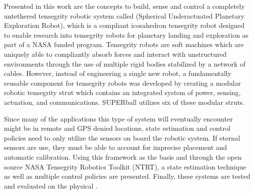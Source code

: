 Presented in this work are the concepts to build, sense and control a completely untethered tensegrity robotic system called \SB{} (Spherical Underactuated Planetary Exploration Robot), which is a compliant icosahedron tensegrity robot designed to enable research into tensegrity robots for planetary landing and exploration as part of a NASA funded program.
Tensegrity robots are soft machines which are uniquely able to compliantly absorb forces and interact with unstructured environments through the use of multiple rigid bodies stabilized by a network of cables.
However, instead of engineering a single new robot, a fundamentally reusable component for tensegrity robots was developed by creating a modular robotic tensegrity strut which contains an integrated system of power, sensing, actuation, and communications.
SUPERball utilizes six of these modular struts.

Since many of the applications this type of system will eventually encounter might be in remote and GPS denied locations, state estimation and control policies need to only utilize the sensors on board the robotic system.
If eternal sensors are use, they must be able to account for imprecise placement and automatic calibration.
Using this framework as the basis and through the open source NASA Tensegrity Robotics Toolkit (NTRT), a state estimation technique as well as multiple control policies are presented.
Finally, these systems are tested and evaluated on the physical \SB{}.

